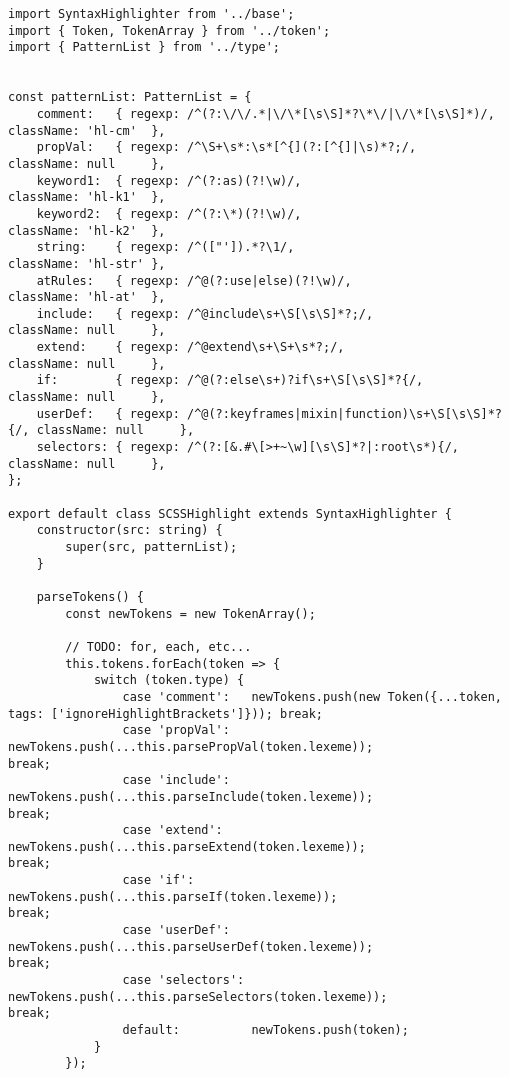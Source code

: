 \documentclass[autodetect-engine,dvi=dvipdfmx,ja=standard,
               a4j,11pt]{bxjsarticle}
\begin{document}
\begin{lstlisting}[caption={CSS/SCSSハイライタ({\tt scss.ts})(1)}, label={prog:scss1}]
import SyntaxHighlighter from '../base';
import { Token, TokenArray } from '../token';
import { PatternList } from '../type';


const patternList: PatternList = {
    comment:   { regexp: /^(?:\/\/.*|\/\*[\s\S]*?\*\/|\/\*[\s\S]*)/,     className: 'hl-cm'  },
    propVal:   { regexp: /^\S+\s*:\s*[^{](?:[^{]|\s)*?;/,                className: null     },  
    keyword1:  { regexp: /^(?:as)(?!\w)/,                                className: 'hl-k1'  },
    keyword2:  { regexp: /^(?:\*)(?!\w)/,                                className: 'hl-k2'  },
    string:    { regexp: /^(["']).*?\1/,                                 className: 'hl-str' },
    atRules:   { regexp: /^@(?:use|else)(?!\w)/,                         className: 'hl-at'  },
    include:   { regexp: /^@include\s+\S[\s\S]*?;/,                      className: null     },
    extend:    { regexp: /^@extend\s+\S+\s*?;/,                          className: null     },
    if:        { regexp: /^@(?:else\s+)?if\s+\S[\s\S]*?{/,               className: null     },
    userDef:   { regexp: /^@(?:keyframes|mixin|function)\s+\S[\s\S]*?{/, className: null     },
    selectors: { regexp: /^(?:[&.#\[>+~\w][\s\S]*?|:root\s*){/,          className: null     },
};

export default class SCSSHighlight extends SyntaxHighlighter {
    constructor(src: string) {
        super(src, patternList);
    }

    parseTokens() {
        const newTokens = new TokenArray();
        
        // TODO: for, each, etc...
        this.tokens.forEach(token => {
            switch (token.type) {
                case 'comment':   newTokens.push(new Token({...token, tags: ['ignoreHighlightBrackets']})); break;
                case 'propVal':   newTokens.push(...this.parsePropVal(token.lexeme));                       break;
                case 'include':   newTokens.push(...this.parseInclude(token.lexeme));                       break;
                case 'extend':    newTokens.push(...this.parseExtend(token.lexeme));                        break;
                case 'if':        newTokens.push(...this.parseIf(token.lexeme));                            break;
                case 'userDef':   newTokens.push(...this.parseUserDef(token.lexeme));                       break;
                case 'selectors': newTokens.push(...this.parseSelectors(token.lexeme));                     break;
                default:          newTokens.push(token);
            }
        });


\end{lstlisting}
\end{document}
